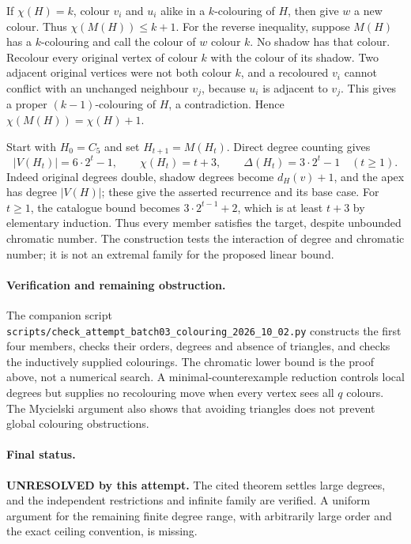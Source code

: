 \documentclass[11pt,a4paper]{article}
\begin{document}
If $\chi(H)=k$, colour $v_i$ and $u_i$ alike in a $k$-colouring
of $H$, then give $w$ a new colour. Thus $\chi(M(H))\le k+1$.
For the reverse inequality, suppose $M(H)$ has a $k$-colouring and
call the colour of $w$ colour $k$. No shadow has that colour.
Recolour every original vertex of colour $k$ with the colour of
its shadow. Two adjacent original vertices were not both colour $k$,
and a recoloured $v_i$ cannot conflict with an unchanged neighbour
$v_j$, because $u_i$ is adjacent to $v_j$. This gives a proper
$(k-1)$-colouring of $H$, a contradiction. Hence
$\chi(M(H))=\chi(H)+1$.

Start with $H_0=C_5$ and set $H_{t+1}=M(H_t)$. Direct degree
counting gives
\[
 |V(H_t)|=6\cdot2^t-1,\qquad \chi(H_t)=t+3,
 \qquad \Delta(H_t)=3\cdot2^t-1\quad(t\ge1).
\]
Indeed original degrees double, shadow degrees become $d_H(v)+1$,
and the apex has degree $|V(H)|$; these give the asserted recurrence
and its base case. For $t\ge1$, the catalogue bound becomes
$3\cdot2^{t-1}+2$, which is at least $t+3$ by elementary induction.
Thus every member satisfies the target, despite unbounded chromatic
number. The construction tests the interaction of degree and chromatic
number; it is not an extremal family for the proposed linear bound.

\paragraph{Verification and remaining obstruction.}
The companion script
\texttt{scripts/check\_attempt\_batch03\_colouring\_2026\_10\_02.py}
constructs the first four members, checks their orders, degrees and
absence of triangles, and checks the inductively supplied colourings.
The chromatic lower bound is the proof above, not a numerical search.
A minimal-counterexample reduction controls local degrees but supplies
no recolouring move when every vertex sees all $q$ colours. The
Mycielski argument also shows that avoiding triangles does not prevent
global colouring obstructions.

\paragraph{Final status.}
\textbf{UNRESOLVED by this attempt.} The cited theorem settles large
degrees, and the independent restrictions and infinite family are
verified. A uniform argument for the remaining finite degree range,
with arbitrarily large order and the exact ceiling convention, is missing.
\end{document}
